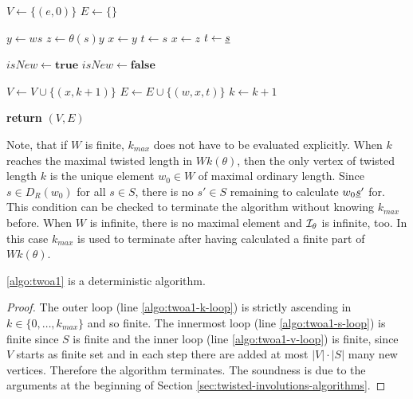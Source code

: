 \begin{algo}[TWOA1]
	\hfill
	\begin{algorithmic}[1]
	\State $V \gets \{(e,0)\}$
	\State $E \gets \{\}$

	 \label{algo:twoa1-k-loop}
		 \label{algo:twoa1-v-loop}
			 \label{algo:twoa1-s-loop} 
				\State $y \gets ws$
				\State $z \gets \theta(s)y$
				 \label{algo:twoa1-check-one-or-bothsided}
					\State $x \gets y$
					\State $t \gets s$
				\Else
					\State $x \gets z$
					\State $t \gets \underline{s}$
				\EndIf
				
				\State $isNew \gets \textbf{true}$
				 \label{algo:twoa1-comp} 
						\State $isNew \gets \textbf{false}$
					\EndIf
				\EndFor
				
					\State $V \gets V \cup \{ (x,k+1) \}$
				\EndIf
				\State $E \gets E \cup \{ (w,x,t) \}$
			\EndFor
		\EndFor
		\State $k \gets k + 1$
	\EndFor

	\State \textbf{return} $(V,E)$
	\EndProcedure
	\end{algorithmic}
\end{algo}

Note, that if $W$ is finite, $k_{max}$ does not have to be evaluated explicitly. When $k$ reaches the maximal twisted length in $Wk(\theta)$, then the only vertex of twisted length $k$ is the unique element $w_0 \in W$ of maximal ordinary length. Since $s \in D_R(w_0)$ for all $s \in S$, there is no $s' \in S$ remaining to calculate $w_0 \underline{s}'$ for. This condition can be checked to terminate the algorithm without knowing $k_{max}$ before. When $W$ is infinite, there is no maximal element and $\mathcal{I}_{\theta}$ is infinite, too. In this case $k_{max}$ is used to terminate after having calculated a finite part of $Wk(\theta)$.

\begin{lemm}
	\ref{algo:twoa1} is a deterministic algorithm.

	\begin{proof}
		The outer loop (line \ref{algo:twoa1-k-loop}) is strictly ascending in $k \in \{0,\ldots,k_{max}\}$ and so finite. The innermost loop (line \ref{algo:twoa1-s-loop}) is finite since $S$ is finite and the inner loop (line \ref{algo:twoa1-v-loop}) is finite, since $V$ starts as finite set and in each step there are added at most $|V| \cdot |S|$ many new vertices. Therefore the algorithm terminates. The soundness is due to the arguments at the beginning of Section \ref{sec:twisted-involutions-algorithms}.
	\end{proof}
\end{lemm}

